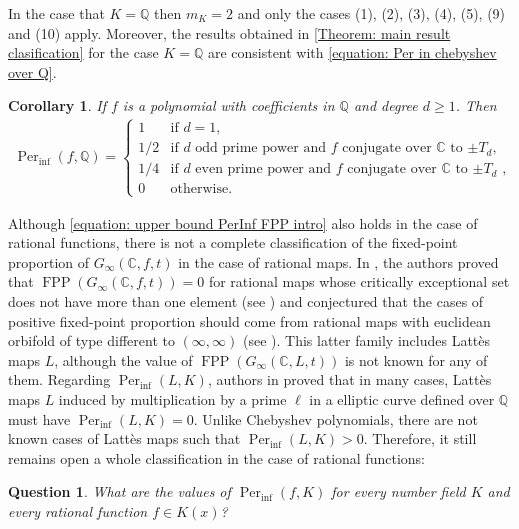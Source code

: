 \documentclass{amsart}
\def\QQ{\mathbb Q}
\def\CC{\mathbb C}
\DeclareMathOperator{\FPP}{FPP}
\DeclareMathOperator{\Per}{Per}
\newtheorem{Corollary}[Theorem]{Corollary}
\newtheorem{Question}[proposition]{Question}
\theoremstyle{definition}
\begin{document}
In the case that $K = \QQ$ then $m_K = 2$ and only the cases (1), (2), (3), (4), (5), (9) and (10) apply. Moreover, the results obtained in \cref{Theorem: main result clasification} for the case $K = \QQ$ are consistent with \cref{equation: Per in chebyshev over Q}. 

\begin{Corollary}
If $f$ is a polynomial with coefficients in $\QQ$ and degree $d \geq 1$. Then 
\begin{align*}
\Per_{\inf}(f,\QQ) = \left \{ \begin{matrix} 
1 & \mbox{if $d = 1$,} \\ 
1/2 & \mbox{if $d$ odd prime power and $f$ conjugate  over $\CC$ to $\pm T_d$,} \\ 
1/4 & \mbox{if $d$ even prime power and $f$ conjugate over $\CC$ to $\pm T_d$ ,} \\
0 & \mbox{otherwise.}
\end{matrix}\right.
\label{equation: Per in chebyshev over Q}
\end{align*} 
\label{Corollary: main result case Q}
\end{Corollary}

Although \cref{equation: upper bound PerInf FPP intro} also holds in the case of rational functions, there is not a complete classification of the fixed-point proportion of $G_\infty(\CC,f,t)$ in the case of rational maps. In \cite{FariñaRadi2026FPP}, the authors proved that $\FPP(G_\infty(\CC,f,t)) = 0$ for rational maps whose critically exceptional set does not have more than one element (see \cite[Theorem 6]{FariñaRadi2026FPP}) and conjectured that the cases of positive fixed-point proportion should come from rational maps with euclidean orbifold of type different to $(\infty, \infty)$ (see \cite[Conjecture 7]{FariñaRadi2026FPP}). This latter family includes Lattès maps $L$, although the value of $\FPP(G_\infty(\CC,L,t))$ is not known for any of them. Regarding $\Per_{\inf}(L,K)$, authors in \cite[Example 7.3]{Juul2014} proved that in many cases, Lattès maps $L$ induced by multiplication by a prime $\ell$ in a elliptic curve defined over $\QQ$ must have $\Per_{\inf}(L,K) = 0$. Unlike Chebyshev polynomials, there are not known cases of Lattès maps such that $\Per_{\inf}(L,K) > 0$. Therefore, it still remains open a whole classification in the case of rational functions:

\begin{Question}
What are the values of $\Per_{\inf}(f,K)$ for every number field $K$ and every rational function $f \in K(x)$?
\end{Question}
\end{document}
